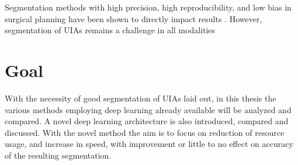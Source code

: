 Segmentation methods with high precision, high reproducibility, and low bias in surgical planning have been shown to directly impact results \cite{Taha2015} . However, segmentation of UIAs remains a challenge in all modalities


\section{Goal}
With the necessity of good segmentation of UIAs laid out, in this thesis the various methods employing deep learning already available will be analyzed and compared. A novel deep learning architecture is also introduced, compared and discussed. With the novel method the aim is to focus on reduction of resource usage, and increase in speed, with improvement or little to no effect on accuracy of the resulting segmentation.







